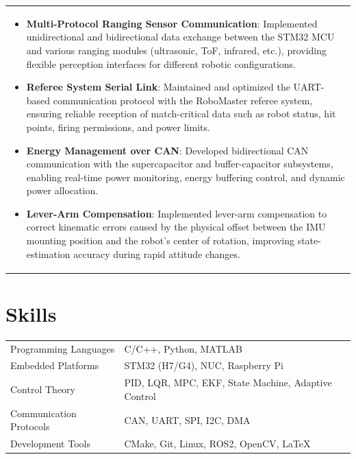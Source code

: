 \documentclass[a4paper,12pt]{article}
\begin{document}
\begin{tabularx}{\linewidth}{@{}X@{}}
\begin{itemize}[nosep,after=\strut, leftmargin=1em, itemsep=3pt,label=--]
\item \textbf{Multi-Protocol Ranging Sensor Communication}: Implemented unidirectional and bidirectional data exchange between the STM32 MCU and various ranging modules (ultrasonic, ToF, infrared, etc.), providing flexible perception interfaces for different robotic configurations.
\item \textbf{Referee System Serial Link}: Maintained and optimized the UART-based communication protocol with the RoboMaster referee system, ensuring reliable reception of match-critical data such as robot status, hit points, firing permissions, and power limits.
\item \textbf{Energy Management over CAN}: Developed bidirectional CAN communication with the supercapacitor and buffer-capacitor subsystems, enabling real-time power monitoring, energy buffering control, and dynamic power allocation.
\item \textbf{Lever-Arm Compensation}: Implemented lever-arm compensation to correct kinematic errors caused by the physical offset between the IMU mounting position and the robot's center of rotation, improving state-estimation accuracy during rapid attitude changes.
\end{itemize}
\end{tabularx}


\section{Skills}
\begin{tabularx}{\linewidth}{@{}l X@{}}
Programming Languages & \normalsize{C/C++, Python, MATLAB}\\
Embedded Platforms & \normalsize{STM32 (H7/G4), NUC, Raspberry Pi}\\
Control Theory & \normalsize{PID, LQR, MPC, EKF, State Machine, Adaptive Control}\\
Communication Protocols & \normalsize{CAN, UART, SPI, I2C, DMA}\\
Development Tools & \normalsize{CMake, Git, Linux, ROS2, OpenCV, LaTeX}\\
\end{tabularx}

\end{document}
